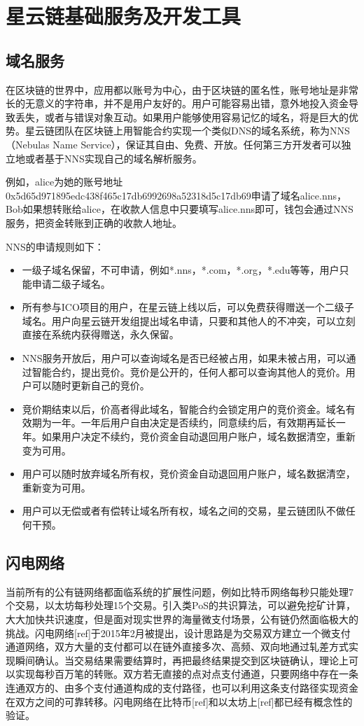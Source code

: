 \section{星云链基础服务及开发工具}
\subsection{域名服务}

在区块链的世界中，应用都以账号为中心，由于区块链的匿名性，账号地址是非常长的无意义的字符串，并不是用户友好的。用户可能容易出错，意外地投入资金导致丢失，或者与错误对象互动。如果用户能够使用容易记忆的域名，将是巨大的优势。星云链团队在区块链上用智能合约实现一个类似DNS的域名系统，称为NNS（Nebulas Name Service），保证其自由、免费、开放。任何第三方开发者可以独立地或者基于NNS实现自己的域名解析服务。

例如，alice为她的账号地址0x5d65d971895edc438f465c17db6992698a52318d5c17db69申请了域名alice.nns，Bob如果想转账给alice，在收款人信息中只要填写alice.nns即可，钱包会通过NNS服务，把资金转账到正确的收款人地址。

NNS的申请规则如下：
\begin{itemize}
	\item 一级子域名保留，不可申请，例如*.nns，*.com，*.org，*.edu等等，用户只能申请二级子域名。
	\item 所有参与ICO项目的用户，在星云链上线以后，可以免费获得赠送一个二级子域名。用户向星云链开发组提出域名申请，只要和其他人的不冲突，可以立刻直接在系统内获得赠送，永久保留。
	\item NNS服务开放后，用户可以查询域名是否已经被占用，如果未被占用，可以通过智能合约，提出竞价。竞价是公开的，任何人都可以查询其他人的竞价。用户可以随时更新自己的竞价。
	\item 竞价期结束以后，价高者得此域名，智能合约会锁定用户的竞价资金。域名有效期为一年。一年后用户自由决定是否续约，同意续约后，有效期再延长一年。如果用户决定不续约，竞价资金自动退回用户账户，域名数据清空，重新变为可用。
	\item 用户可以随时放弃域名所有权，竞价资金自动退回用户账户，域名数据清空，重新变为可用。
	\item 用户可以无偿或者有偿转让域名所有权，域名之间的交易，星云链团队不做任何干预。
\end{itemize}


\subsection{闪电网络}
当前所有的公有链网络都面临系统的扩展性问题，例如比特币网络每秒只能处理7个交易，以太坊每秒处理15个交易。引入类PoS的共识算法，可以避免挖矿计算，大大加快共识速度，但是面对现实世界的海量微支付场景，公有链仍然面临极大的挑战。闪电网络[ref]于2015年2月被提出，设计思路是为交易双方建立一个微支付通道网络，双方大量的支付都可以在链外直接多次、高频、双向地通过轧差方式实现瞬间确认。当交易结果需要结算时，再把最终结果提交到区块链确认，理论上可以实现每秒百万笔的转账。双方若无直接的点对点支付通道，只要网络中存在一条连通双方的、由多个支付通道构成的支付路径，也可以利用这条支付路径实现资金在双方之间的可靠转移。闪电网络在比特币[ref]和以太坊上[ref]都已经有概念性的验证。

